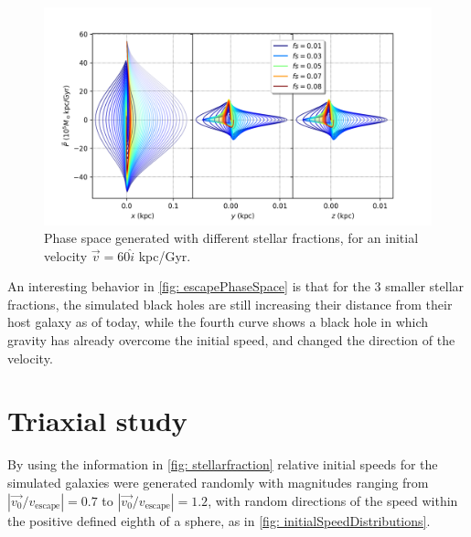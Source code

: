 	\begin{figure}[h]
		\centering
		\includegraphics[width = 0.9\linewidth]{"../Files/Week 9/PhaseSpace_in"}
		\caption{Phase space generated with different stellar fractions, for an initial velocity $\vec{v} = 60\hat{i}$ kpc/Gyr.}
		\label{fig: escapeInner}
	\end{figure}

	An interesting behavior in \autoref{fig: escapePhaseSpace} is that for the 3 smaller stellar fractions, the simulated black holes are still increasing their distance from their host galaxy as of today, while the fourth curve shows a black hole in which gravity has already overcome the initial speed, and changed the direction of the velocity.
	
	\section{Triaxial study}
	By using the information in \autoref{fig: stellarfraction} relative initial speeds for the simulated galaxies were generated randomly with magnitudes ranging from $|\vec{v_0}/v_{\text{escape}}| = 0.7$ to $|\vec{v_0}/v_{\text{escape}}| = 1.2$, with random directions of the speed within the positive defined eighth of a sphere, as in \autoref{fig: initialSpeedDistributions}.
	
